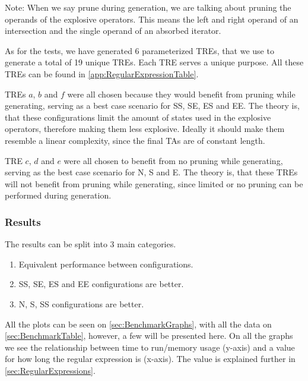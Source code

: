 Note: When we say prune during generation, we are talking about pruning the operands of the explosive operators.
This means the left and right operand of an intersection and the single operand of an absorbed iterator.

\vspace{.5\baselineskip plus 2pt}
As for the tests, we have generated 6 parameterized TREs, that we use to generate a total of 19 unique TREs.
Each TRE serves a unique purpose.
All these TREs can be found in \cref{app:RegularExpressionTable}.

\vspace{.5\baselineskip plus 2pt}
TREs $a$, $b$ and $f$ were all chosen because they would benefit from pruning while generating, serving as a best case scenario for SS, SE, ES and EE.
The theory is, that these configurations limit the amount of states used in the explosive operators, therefore making them less explosive.
Ideally it should make them resemble a linear complexity, since the final TAs are of constant length.

\vspace{.5\baselineskip plus 2pt}
TRE $c$, $d$ and $e$ were all chosen to benefit from no pruning while generating, serving as the best case scenario for N, S and E.
The theory is, that these TREs will not benefit from pruning while generating, since limited or no pruning can be performed during generation.

\subsubsection{Results}
The results can be split into 3 main categories.

\vspace{0.75em}
\begin{enumerate}
    \setlength\itemsep{0em}
    \item Equivalent performance between configurations.
    \item SS, SE, ES and EE configurations are better.
    \item N, S, SS configurations are better.
\end{enumerate}
\vspace{0.75em}

All the plots can be seen on \cref{sec:BenchmarkGraphs}, with all the data on \cref{sec:BenchmarkTable}, however, a few will be presented here.
On all the graphs we see the relationship between time to run/memory usage (y-axis) and a value for how long the regular expression is (x-axis). The value is explained further in \cref{sec:RegularExpressions}.

